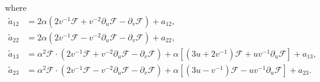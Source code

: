 \documentclass[10pt,leqno]{amsart}
\numberwithin{equation}{section}
\begin{document}
where 
\begin{equation} \label{coefficient tilde a} 
	\begin{aligned}
		\tilde{a}_{12} & = 2\alpha ( 2v^{-1} \mathcal{F} + v^{-2}  \partial_{u} \mathcal{F} - \partial_{v} \mathcal{F})  + {a}_{12}, \\
		\tilde{a}_{22} & = 2\alpha (2v^{-1} \mathcal{F} - v^{-2}  \partial_{u} \mathcal{F} - \partial_{v} \mathcal{F}) + {a}_{22},\\
		\tilde{a}_{13} & = \alpha^2 \mathcal{F} \cdot ( 2v^{-1} \mathcal{F} + v^{-2}  \partial_{u} \mathcal{F} - \partial_{v} \mathcal{F} )  + \alpha [(3u + 2v^{-1}) \mathcal{F} + uv^{-1} \partial_{u} \mathcal{F} ] +a_{13}, \\
		\tilde{a}_{23} & =\alpha^2 \mathcal{F} \cdot ( 2v^{-1} \mathcal{F} - v^{-2}  \partial_{u} \mathcal{F} - \partial_{v} \mathcal{F} )  + \alpha [(3u -v^{-1}) \mathcal{F} - uv^{-1} \partial_{u} \mathcal{F} ] +a_{23}.
	\end{aligned}
\end{equation}	
\end{document}
